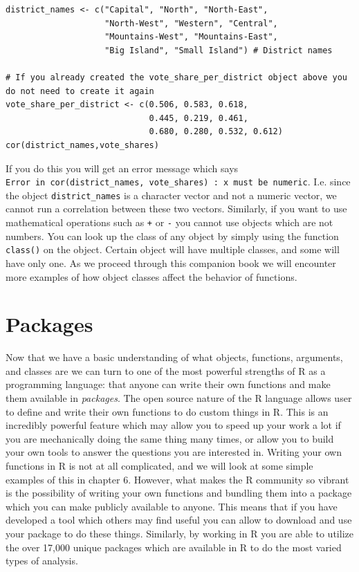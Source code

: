 \documentclass[
]{book}
\begin{document}
\begin{verbatim}
district_names <- c("Capital", "North", "North-East",
                    "North-West", "Western", "Central",
                    "Mountains-West", "Mountains-East",
                    "Big Island", "Small Island") # District names

# If you already created the vote_share_per_district object above you do not need to create it again
vote_share_per_district <- c(0.506, 0.583, 0.618, 
                             0.445, 0.219, 0.461, 
                             0.680, 0.280, 0.532, 0.612) 
cor(district_names,vote_shares)
\end{verbatim}

If you do this you will get an error message which says \texttt{Error\ in\ cor(district\_names,\ vote\_shares)\ :\ \textquotesingle{}x\textquotesingle{}\ must\ be\ numeric}. I.e. since the object \texttt{district\_names} is a character vector and not a numeric vector, we cannot run a correlation between these two vectors. Similarly, if you want to use mathematical operations such as \texttt{+} or \texttt{-} you cannot use objects which are not numbers. You can look up the class of any object by simply using the function \texttt{class()} on the object. Certain object will have multiple classes, and some will have only one. As we proceed through this companion book we will encounter more examples of how object classes affect the behavior of functions.

\hypertarget{packages}{%
\section{Packages}\label{packages}}

Now that we have a basic understanding of what objects, functions, arguments, and classes are we can turn to one of the most powerful strengths of R as a programming language: that anyone can write their own functions and make them available in \emph{packages}. The open source nature of the R language allows user to define and write their own functions to do custom things in R. This is an incredibly powerful feature which may allow you to speed up your work a lot if you are mechanically doing the same thing many times, or allow you to build your own tools to answer the questions you are interested in. Writing your own functions in R is not at all complicated, and we will look at some simple examples of this in chapter 6. However, what makes the R community so vibrant is the possibility of writing your own functions and bundling them into a package which you can make publicly available to anyone. This means that if you have developed a tool which others may find useful you can allow to download and use your package to do these things. Similarly, by working in R you are able to utilize the over 17,000 unique packages which are available in R to do the most varied types of analysis.
\end{document}
